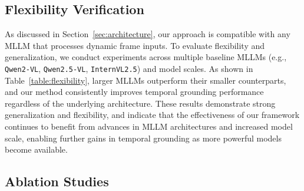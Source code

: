 \subsection{Flexibility Verification}
\label{subsec:flexibility}
As discussed in Section~\ref{sec:architecture}, our approach is compatible with any MLLM that processes dynamic frame inputs. To evaluate flexibility and generalization, we conduct experiments across multiple baseline MLLMs (e.g., \texttt{Qwen2-VL}, \texttt{Qwen2.5-VL}, \texttt{InternVL2.5}) and model scales. As shown in Table~\ref{table:flexibility}, larger MLLMs outperform their smaller counterparts, and our method consistently improves temporal grounding performance regardless of the underlying architecture. These results demonstrate strong generalization and flexibility, and indicate that the effectiveness of our framework continues to benefit from advances in MLLM architectures and increased model scale, enabling further gains in temporal grounding as more powerful models become available.

\subsection{Ablation Studies}
\label{subsec:ablation}

